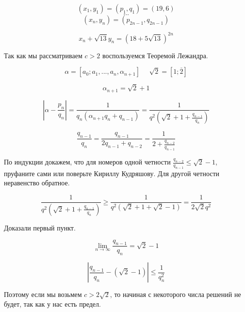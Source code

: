 \[(x_1, y_1) = (p_1, q_1) = (19, 6)\]
\[\dots\]
\[(x_n, y_n) = (p_{2n - 1}, q_{2n - 1})\]

\[x_n + \sqrt{13}y_n = (18 + 5 \sqrt{13})^{2n}\]


Так как мы рассматриваем $c > 2$ воспользуемся Теоремой Лежандра.

\[\alpha = [a_0; a_1, ..., a_n, \alpha_{n + 1}] \ \ \ \ \ \ \sqrt{2} = [1; \overline{2}]\]

\[\alpha_{n + 1} = \sqrt{2} + 1\]

\[|\alpha - \frac{p_n}{q_n}| = \frac{1}{q_n(\alpha_{n + 1}q_n + q_{n - 1})} = \frac{1}{q^2(\sqrt{2} + 1 + \frac{q_{n - 1}}{q_n})}\]

\[\frac{q_{n - 1}}{q_n} = \frac{q_{n - 1}}{2q_{n - 1} + q_{n - 2}} = \frac{1}{2 + \frac{q_{n - 2}}{q_{n - 1}}}\]


По индукции докажем, что для номеров одной четности $\frac{q_{n - 2}}{q_{n - 1}} \leq \sqrt{2} - 1$, пруфаните сами или поверьте Кириллу Кудряшову.
Для другой четности неравенство обратное.

\[\frac{1}{q^2(\sqrt{2} + 1 + \frac{q_{n - 1}}{q_n})} \geq \frac{1}{q^2(\sqrt{2} + 1 + \sqrt{2} - 1)} = \frac{1}{2\sqrt{2}q^2}\]

Доказали первый пункт.

\[\lim\limits_{n \to \infty} \frac{q_{n - 1}}{q_n} = \sqrt{2} - 1\]

\[|\frac{q_{n - 1}}{q_n} - (\sqrt{2} - 1)| \leq \frac{1}{q_n^2}\]

Поэтому если мы возьмем $c > 2 \sqrt{2}$, то начиная с некоторого числа решений не будет, так как у нас есть предел.
